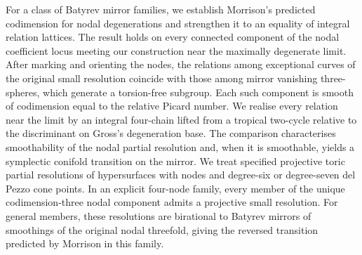 For a class of Batyrev mirror families, we establish Morrison's predicted codimension for nodal degenerations and
strengthen it to an equality of integral relation lattices. The result holds on every connected component of the
nodal coefficient locus meeting our construction near the maximally degenerate limit. After marking and orienting
the nodes, the relations among exceptional curves of the original small resolution coincide with those among mirror
vanishing three-spheres, which generate a torsion-free subgroup. Each such component is smooth of codimension equal
to the relative Picard number. We realise every relation near the limit by an integral four-chain lifted from a
tropical two-cycle relative to the discriminant on Gross's degeneration base. The comparison characterises
smoothability of the nodal partial resolution and, when it is smoothable, yields a symplectic conifold transition on the mirror. We treat
specified projective toric partial resolutions of hypersurfaces with nodes and degree-six or degree-seven del Pezzo
cone points. In an explicit four-node family, every member of the unique codimension-three nodal component admits a
projective small resolution. For general members, these resolutions are birational to Batyrev mirrors of smoothings
of the original nodal threefold, giving the reversed transition predicted by Morrison in this family.
